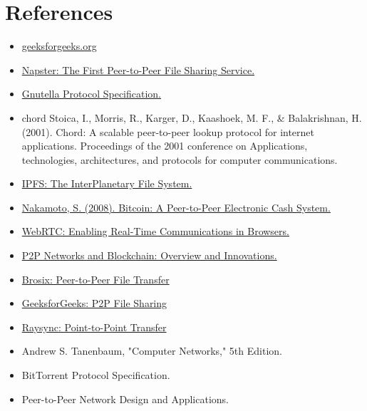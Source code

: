 \documentclass[a4paper,12pt]{article}
\begin{document}
\section{References}
\begin{itemize}
    \item \href{https://www.geeksforgeeks.org/peer-to-peer-p2p-architecture/#what-is-a-peertopeer-p2p-architecture}{geeksforgeeks.org}

    \item \href{https://example.com/napster}{Napster: The First Peer-to-Peer File Sharing Service.}

    \item \href{https://example.com/gnutella}{Gnutella Protocol Specification. }
    
    \item{chord Stoica, I., Morris, R., Karger, D., Kaashoek, M. F., \& Balakrishnan, H. (2001). Chord: A scalable peer-to-peer lookup protocol for internet applications. Proceedings of the 2001 conference on Applications, technologies, architectures, and protocols for computer communications.}
    
    \item \href{https://ipfs.io/}{IPFS: The InterPlanetary File System.}
    
    \item \href{https://bitcoin.org/bitcoin.pdf}{Nakamoto, S. (2008). Bitcoin: A Peer-to-Peer Electronic Cash System.}
    
    \item\href{https://webrtc.org/}{WebRTC: Enabling Real-Time Communications in Browsers.}
    
    \item \href{https://example.com/blockchain_p2p}{P2P Networks and Blockchain: Overview and Innovations.}


    \item \href{https://www.brosix.com/blog/peer-peer-file-transfer/}{Brosix: Peer-to-Peer File Transfer}
    \item \href{https://www.geeksforgeeks.org/p2p-peer-to-peer-file-sharing/}{GeeksforGeeks: P2P File Sharing}
    \item \href{https://www.raysync.io/news/everything-you-need-to-know-about-point-to-point-transfer/}{Raysync: Point-to-Point Transfer}
    \item Andrew S. Tanenbaum, "Computer Networks," 5th Edition.
    \item BitTorrent Protocol Specification.
    \item Peer-to-Peer Network Design and Applications.


\end{itemize}
\end{document}
